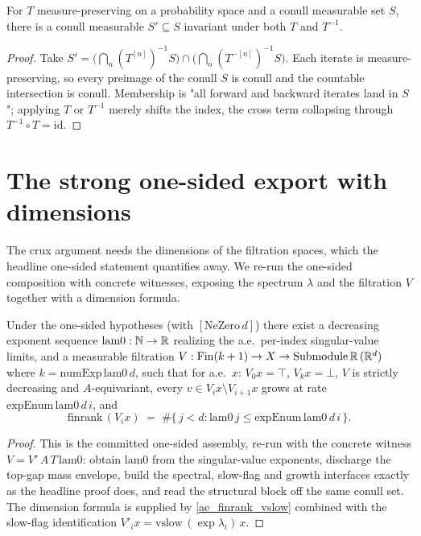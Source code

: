 \begin{lemma}\label{exists_conull_biinvariant}
  \leanok
  For \(T\) measure-preserving on a probability space and a conull measurable set \(S\), there is a conull measurable \(S' \subseteq S\) invariant under both \(T\) and \(T^{-1}\).
\end{lemma}
\begin{proof}\leanok
  Take \(S' = \bigl(\bigcap_n (T^{[n]})^{-1}S\bigr) \cap \bigl(\bigcap_n (T^{-[n]})^{-1}S\bigr)\). Each iterate is measure-preserving, so every preimage of the conull \(S\) is conull and the countable intersection is conull. Membership is "all forward and backward iterates land in \(S\)"; applying \(T\) or \(T^{-1}\) merely shifts the index, the cross term collapsing through \(T^{-1}\circ T = \mathrm{id}\).
\end{proof}

\section{The strong one-sided export with dimensions}

The crux argument needs the dimensions of the filtration spaces, which the headline one-sided statement quantifies away. We re-run the one-sided composition with concrete witnesses, exposing the spectrum \(\lambda\) and the filtration \(V\) together with a dimension formula.

\begin{proposition}\label{oseledets_filtration_dims}
  \leanok
  Under the one-sided hypotheses (with \([\mathrm{NeZero}\,d]\)) there exist a decreasing exponent sequence \(\mathrm{lam0} : \mathbb{N} \to \mathbb{R}\) realizing the a.e.\ per-index singular-value limits, and a measurable filtration \(V : \mathrm{Fin}(k+1) \to X \to \mathrm{Submodule}\,\mathbb{R}\,(\mathbb{R}^d)\) where \(k = \mathrm{numExp}\,\mathrm{lam0}\,d\), such that for a.e.\ \(x\): \(V_0 x = \top\), \(V_k x = \bot\), \(V\) is strictly decreasing and \(A\)-equivariant, every \(v \in V_{i}x \setminus V_{i+1}x\) grows at rate \(\mathrm{expEnum}\,\mathrm{lam0}\,d\,i\), and
  \[
    \mathrm{finrank}\,(V_{i}x) \;=\; \#\{\, j < d : \mathrm{lam0}\,j \le \mathrm{expEnum}\,\mathrm{lam0}\,d\,i \,\}.
  \]
\end{proposition}
\begin{proof}\leanok
  This is the committed one-sided assembly, re-run with the concrete witness \(V = V'\,A\,T\,\mathrm{lam0}\): obtain \(\mathrm{lam0}\) from the singular-value exponents, discharge the top-gap mass envelope, build the spectral, slow-flag and growth interfaces exactly as the headline proof does, and read the structural block off the same conull set. The dimension formula is supplied by \cref{ae_finrank_vslow} combined with the slow-flag identification \(V'_i x = \mathrm{vslow}\,(\exp\lambda_i)\,x\).
\end{proof}


